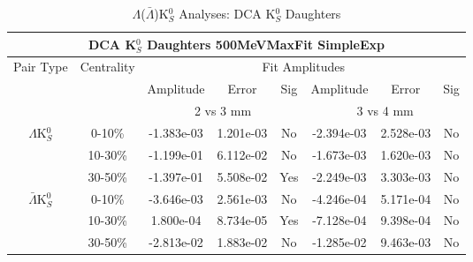 \documentclass[../AnalysisNoteJBuxton.tex]{subfiles}
\begin{document}
\begin{table}
 \centering
 \begin{tabular}{|c|c|c|c|c||c|c|c|}
  \multicolumn{8}{c}{DCA K$^{0}_{S}$ Daughters 500MeVMaxFit SimpleExp} \\
  \hline
  \multirow{3}{*}{Pair Type} & \multirow{3}{*}{Centrality} & \multicolumn{6}{c|}{Fit Amplitudes} \\
  \cline{3-8}
   & & Amplitude & Error & Sig & Amplitude & Error & Sig \\  
  \cline{3-8}
   & & \multicolumn{3}{c||}{2 vs 3 mm} & \multicolumn{3}{c|}{3 vs 4 mm} \\  
  \hline  
  \multirow{3}{*}{$\Lambda$K$^{0}_{S}$}  
   &  0-10\% & -1.383e-03 & 1.201e-03 & No & -2.394e-03 & 2.528e-03 & No \\
   & 10-30\% & -1.199e-01 & 6.112e-02 & No & -1.673e-03 & 1.620e-03 & No \\
   & 30-50\% & -1.397e-01 & 5.508e-02 & Yes & -2.249e-03 & 3.303e-03 & No \\
  \hline  
  \multirow{3}{*}{$\bar{\Lambda}$K$^{0}_{S}$}  
   &  0-10\% & -3.646e-03 & 2.561e-03 & No & -4.246e-04 & 5.171e-04 & No \\
   & 10-30\% & 1.800e-04 & 8.734e-05 & Yes & -7.128e-04 & 9.398e-04 & No \\
   & 30-50\% & -2.813e-02 & 1.883e-02 & No & -1.285e-02 & 9.463e-03 & No \\
  \hline
 \end{tabular}
 \caption{$\Lambda$($\bar{\Lambda}$)K$^{0}_{S}$ Analyses: DCA K$^{0}_{S}$ Daughters}
 \label{tab:K0DaughtersDcaLamK0_500MeVMaxFit_SimpleExp}
\end{table}




\end{document}
